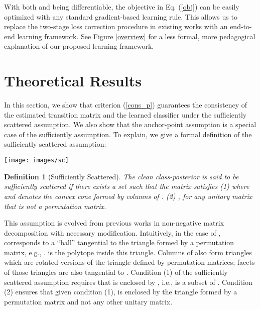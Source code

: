 \documentclass{article}
\newtheorem{definition}{Definition}
\begin{document}
With both  and  being differentiable, the objective in Eq. (\ref{obj}) can be easily optimized with any standard gradient-based learning rule. This allows us to replace the two-stage loss correction procedure in existing works with an end-to-end learning framework. See Figure \ref{overview} for a less formal, more pedagogical explanation of our proposed learning framework.
 


\section{Theoretical Results}



In this section, we show that criterion (\ref{cons_p}) guarantees the consistency of the estimated transition matrix and the learned classifier under the sufficiently scattered assumption. We also show that the anchor-point assumption is a special case of the sufficiently assumption. To explain, we give a formal definition of the sufficiently scattered assumption:


\begin{figure*}[ht]
\begin{center}
	\texttt{[image: images/sc]}
\end{center} 
	\caption{Illustration of the anchor-point assumption and the sufficiently scattered assumption in the case of  by assuming that the viewer are facing the hyperplane  from the positive orthant. The dots are class-posterior probabilities ; the triangle is the non-negative orthant; the inner circle is ; the region encompassed by red lines is . Clearly, the anchor-point assumption (a) is a special case of the sufficiently scattered assumption (b).}
	\label{sc}
\end{figure*}
\begin{definition}[Sufficiently Scattered] The clean class-posterior  is said to be sufficiently scattered if there exists a set  such that the matrix  satisfies (1)  \; where  and  denotes the convex cone formed by columns of . (2) , \;for any unitary matrix  that is not a permutation matrix. 
	\label{def:sc}
\end{definition}



This assumption is evolved from previous works in non-negative matrix decomposition \cite{fu2015blind, fu2018identifiability} with necessary modification. Intuitively, in the case of ,  corresponds to a ``ball'' tangential to the triangle formed by a permutation matrix, e.g., .  is the polytope inside this triangle. Columns of  also form triangles which are rotated versions of the triangle defined by permutation matrices; facets of those triangles are also tangential to . Condition (1) of the sufficiently scattered assumption requires that  is enclosed by , i.e.,  is a subset of . Condition (2) ensures that given condition (1),  is enclosed by the triangle formed by a permutation matrix and not any other unitary matrix. 
\end{document}
